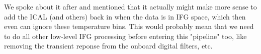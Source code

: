 \documentclass{article}
\begin{document}
We spoke about it after and mentioned that it actually might make more sense to add the ICAL (and others) back in when the data is in IFG space, which then even can ignore these temperature bins.
This would probably mean that we need to do all other low-level IFG processing before entering this "pipeline" too, like removing the transient reponse from the  onboard digital filters, etc.

%



\end{document}
